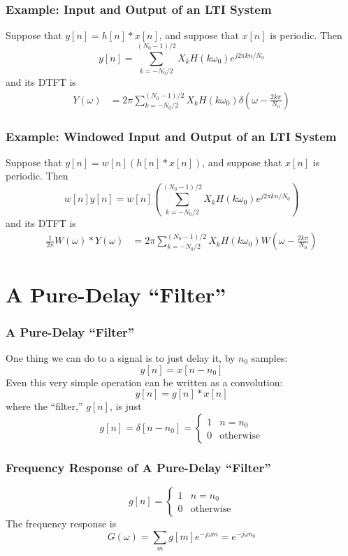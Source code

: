 \documentclass{beamer}
\begin{document}
\begin{frame}
  \frametitle{Example: Input and Output of an LTI System}

  Suppose that $y[n]=h[n]\ast x[n]$, and suppose that $x[n]$ is periodic.  Then
  \[
  y[n] = \sum_{k=-N_0/2}^{(N_0-1)/2} X_k H(k\omega_0) e^{j2\pi kn/N_0}
  \]
  and its DTFT is
  \begin{align*}
    Y(\omega) &=2\pi\sum_{k=-N_0/2}^{(N_0-1)/2} X_kH(k\omega_0)
    \delta\left(\omega-\frac{2k\pi}{N_0}\right)
  \end{align*}
\end{frame}

\begin{frame}
  \frametitle{Example: Windowed Input and Output of an LTI System}

  Suppose that $y[n]=w[n]\left(h[n]\ast x[n]\right)$, and suppose that $x[n]$ is periodic.  Then
  \[
  w[n]y[n] = w[n]\left(\sum_{k=-N_0/2}^{(N_0-1)/2} X_k H(k\omega_0) e^{j2\pi kn/N_0}\right)
  \]
  and its DTFT is
  \begin{align*}
    \frac{1}{2\pi}W(\omega)\ast Y(\omega) &=2\pi\sum_{k=-N_0/2}^{(N_0-1)/2} X_kH(k\omega_0)
    W\left(\omega-\frac{2k\pi}{N_0}\right)
  \end{align*}
\end{frame}

\section[Pure Delay]{A Pure-Delay ``Filter''}
\setcounter{subsection}{1}

\begin{frame}
  \frametitle{A Pure-Delay ``Filter''}

  One thing we can do to a signal is to just delay it, by $n_0$ samples:
  \[
  y[n] = x[n-n_0]
  \]
  Even this very simple operation can be written as a convolution:
  \[
  y[n]=g[n]\ast x[n]
  \]
  where the ``filter,'' $g[n]$, is just
  \[
  g[n]=\delta[n-n_0] = \begin{cases}
  1 & n=n_0\\
  0 & \mbox{otherwise}
  \end{cases}
  \]
\end{frame}

\begin{frame}
  \frametitle{Frequency Response of A Pure-Delay ``Filter''}

  \[
  g[n]=\begin{cases}
  1 & n=n_0\\
  0 & \mbox{otherwise}
  \end{cases}
  \]
  The frequency response is
  \[
  G(\omega)=\sum_m g[m]e^{-j\omega m} = e^{-j\omega n_0}
  \]
  
\end{frame}
\end{document}
